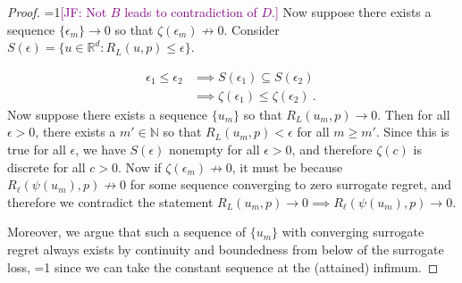 \documentclass{article}
\newcommand{\Comments}{1}
\newcommand{\mynote}[2]{\ifnum\Comments=1\textcolor{#1}{#2}\fi}
\newcommand{\mytodo}[2]{\ifnum\Comments=1%
	\todo[linecolor=#1!80!black,backgroundcolor=#1,bordercolor=#1!80!black]{#2}\fi}
\newcommand{\jessie}[1]{\mynote{purple}{[JF: #1]}}
\newcommand{\jessiet}[1]{\mytodo{purple!20!white}{JF: #1}}
\newcommand{\btw}[1]{\mytodo{gray!10!white}{\textcolor{gray}{BTW: #1}}}%
\newcommand{\reals}{\mathbb{R}}
\newcommand{\simplex}{\Delta_\Y}
\newcommand{\Y}{\mathcal{Y}}
\begin{document}
\begin{proof}
\jessie{Not $B$ leads to contradiction of $D$.}
Now suppose there exists a sequence $\{\epsilon_m\} \to 0$ so that $\zeta(\epsilon_m) \not \to 0$.
Consider $S(\epsilon) = \{u \in \reals^d : R_L(u,p) \leq \epsilon\}$.

\begin{align*}
\epsilon_1 \leq \epsilon_2 &\implies S(\epsilon_1) \subseteq S(\epsilon_2)\\
&\implies \zeta(\epsilon_1) \leq \zeta(\epsilon_2)~.~
\end{align*}
Now suppose there exists a sequence $\{u_m\}$ so that $R_L(u_m, p) \to 0$.
Then for all $\epsilon > 0$, there exists a $m' \in \mathbb{N}$ so that $R_L(u_m, p) < \epsilon$ for all $m \geq m'$.
Since this is true for all $\epsilon$, we have $S(\epsilon)$ nonempty for all $\epsilon > 0$, and therefore $\zeta(c)$ is discrete for all $c > 0$.
Now if $\zeta(\epsilon_m) \not \to 0$, it must be because $R_\ell(\psi(u_m), p) \not \to 0$ for some sequence converging to zero surrogate regret, and therefore we contradict the statement $R_L(u_m, p) \to 0 \implies R_\ell(\psi(u_m), p) \to 0$.

Moreover, we argue that such a sequence of $\{u_m\}$ with converging surrogate regret always exists by continuity and boundedness from below of the surrogate loss,
\btw{really just need lower semi-continuity and boundedness from below}
since we can take the constant sequence at the (attained) infimum.
%
%	
\end{proof}
\end{document}
